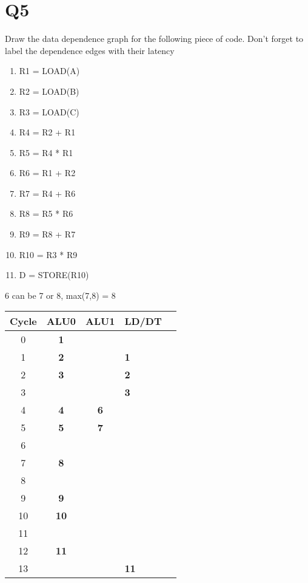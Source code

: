 \documentclass{report}
\begin{document}
\section{Q5}
Draw the data dependence graph for the following piece of code. Don't forget to label the dependence edges with their latency
\vspace{-1em}
\begin{multicols}{2}
\begin{enumerate}
  \item R1 = LOAD(A)
  \item R2 = LOAD(B)
  \item R3 = LOAD(C)
  \item R4 = R2 + R1
  \item R5 = R4 * R1
  \item R6 = R1 + R2
  \item R7 = R4 + R6
  \item R8 = R5 * R6
  \item R9 = R8 + R7
  \item R10 = R3 * R9
  \item D = STORE(R10)
\end{enumerate}
6 can be 7 or 8, max(7,8) = 8 \\
  \begin{tabular}{|c|>{\bfseries}c|>{\bfseries}c|>{\bfseries}l|>{\bfseries}l|}
    \hline
  	Cycle & ALU0   & ALU1 & LD/DT \\
    \hline
     0 &  1 &   &    \\
    \hline
     1 &  2 &   & 1  \\
    \hline
     2 &  3 &   & 2  \\
    \hline
     3 &    &   & 3  \\
    \hline
     4 &  4 & 6 &    \\
    \hline
     5 &  5 & 7 &    \\
    \hline
     6 &    &   &    \\
    \hline
     7 &  8 &   &    \\
    \hline
     8 &    &   &    \\
    \hline
     9 &  9 &   &    \\
    \hline
    10 & 10 &   &    \\
    \hline
    11 &    &   &    \\
    \hline
    12 & 11 &   &    \\
    \hline
    13 &    &   & 11 \\
    \hline
  \end{tabular}
  \vfill\columnbreak

\end{multicols}
\end{document}
